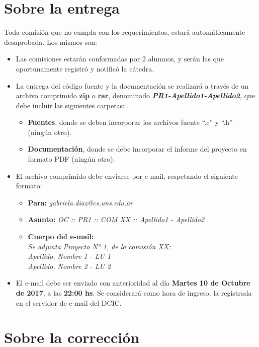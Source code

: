 \documentclass[12pt,a4paper]{article}
\begin{document}
\section*{Sobre la entrega}
Toda comisión que no cumpla con los requerimientos, estará automáticamente desaprobada. Los mismos son:
\begin{itemize}
		
	\item Las comisiones estarán conformadas por 2 alumnos, y serán las que oportunamente registró y notificó la cátedra.
		
	\item La entrega del código fuente y la documentación se realizará a través de un archivo comprimido \textbf{zip} o \textbf{rar}, denominado \textbf{\textit{PR1-Apellido1-Apellido2}}, que debe incluir las siguientes carpetas:
	\begin{itemize}
		\item \textbf{Fuentes}, donde se deben incorporar los archivos fuente “.c” y “.h” (ningún otro).
		\item \textbf{Documentación}, donde se debe incorporar el informe del proyecto en formato PDF (ningún otro).
	\end{itemize}		
	\item El archivo comprimido debe enviarse por e-mail, respetando el siguiente formato: 
	\begin{itemize}
		\item \textbf{Para:} \textit{gabriela.diaz@cs.uns.edu.ar}
		\item \textbf{Asunto:} \textit{OC :: PR1 :: COM XX :: Apellido1 - Apellido2}
		\item \textbf{Cuerpo del e-mail:} \\
		\textit{Se adjunta Proyecto Nº 1, de la comisión XX: } \\
		\textit{Apellido, Nombre 1 - LU 1} \\
		\textit{Apellido, Nombre 2 - LU 2}
	\end{itemize}
	
	\item El e-mail debe ser enviado con anterioridad al día \textbf{Martes 10 de Octubre de 2017}, a las \textbf{22:00 hs}. Se considerará como hora de ingreso, la registrada en el servidor de e-mail del DCIC.
		
\end{itemize}

\section*{Sobre la corrección}
\end{document}
